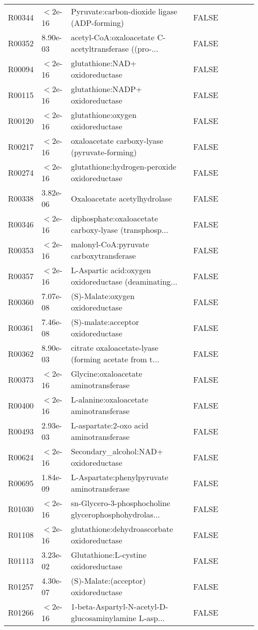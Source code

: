 \documentclass{article}\usepackage[]{graphicx}\usepackage[]{color}
\begin{document}
{{\begin{tabular}{llllllll}
  R00344 & $<$2e-16 & Pyruvate:carbon-dioxide ligase (ADP-forming) & FALSE &  &  &  &  \\ 
  R00352 &  8.90e-03 & acetyl-CoA:oxaloacetate C-acetyltransferase ((pro-... & FALSE &  &  &  &  \\ 
  R00094 & $<$2e-16 & glutathione:NAD+ oxidoreductase & FALSE &  &  &  &  \\ 
  R00115 & $<$2e-16 & glutathione:NADP+ oxidoreductase & FALSE &  &  &  &  \\ 
  R00120 & $<$2e-16 & glutathione:oxygen oxidoreductase & FALSE &  &  &  &  \\ 
  R00217 & $<$2e-16 & oxaloacetate carboxy-lyase (pyruvate-forming) & FALSE &  &  &  &  \\ 
  R00274 & $<$2e-16 & glutathione:hydrogen-peroxide oxidoreductase & FALSE &  &  &  &  \\ 
  R00338 &  3.82e-06 & Oxaloacetate acetylhydrolase & FALSE &  &  &  &  \\ 
  R00346 & $<$2e-16 & diphosphate:oxaloacetate carboxy-lyase (transphosp... & FALSE &  &  &  &  \\ 
  R00353 & $<$2e-16 & malonyl-CoA:pyruvate carboxytransferase & FALSE &  &  &  &  \\ 
  R00357 & $<$2e-16 & L-Aspartic acid:oxygen oxidoreductase (deaminating... & FALSE &  &  &  &  \\ 
  R00360 &  7.07e-08 & (S)-Malate:oxygen oxidoreductase & FALSE &  &  &  &  \\ 
  R00361 &  7.46e-08 & (S)-malate:acceptor oxidoreductase & FALSE &  &  &  &  \\ 
  R00362 &  8.90e-03 & citrate oxaloacetate-lyase (forming acetate from t... & FALSE &  &  &  &  \\ 
  R00373 & $<$2e-16 & Glycine:oxaloacetate aminotransferase & FALSE &  &  &  &  \\ 
  R00400 & $<$2e-16 & L-alanine:oxaloacetate aminotransferase & FALSE &  &  &  &  \\ 
  R00493 &  2.93e-03 & L-aspartate:2-oxo acid aminotransferase & FALSE &  &  &  &  \\ 
  R00624 & $<$2e-16 & Secondary\_alcohol:NAD+ oxidoreductase & FALSE &  &  &  &  \\ 
  R00695 &  1.84e-09 & L-Aspartate:phenylpyruvate aminotransferase & FALSE &  &  &  &  \\ 
  R01030 & $<$2e-16 & sn-Glycero-3-phosphocholine glycerophosphohydrolas... & FALSE &  &  &  &  \\ 
  R01108 & $<$2e-16 & glutathione:dehydroascorbate oxidoreductase & FALSE &  &  &  &  \\ 
  R01113 &  3.23e-02 & Glutathione:L-cystine oxidoreductase & FALSE &  &  &  &  \\ 
  R01257 &  4.30e-07 & (S)-Malate:(acceptor) oxidoreductase & FALSE &  &  &  &  \\ 
  R01266 & $<$2e-16 & 1-beta-Aspartyl-N-acetyl-D-glucosaminylamine L-asp... & FALSE &  &  &  &  \\ 
   \hline
\end{tabular}
}

}
\end{document}

